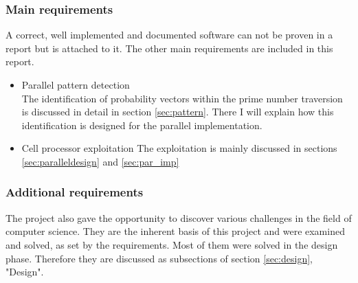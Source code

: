 \subsubsection{Main requirements}
\label{sec:main_req}
A correct, well implemented and documented software can not be proven in a report but is attached to it. The other main requirements are included in this report.

\begin{itemize}%
   \item Parallel pattern detection\\
      The identification of probability vectors within the prime number traversion is discussed in detail in section \ref{sec:pattern}. There I will explain how this identification is designed for the parallel implementation.
   \item Cell processor exploitation
      The exploitation is mainly discussed in sections \ref{sec:paralleldesign} and \ref{sec:par_imp}
\end{itemize}%


\subsubsection{Additional requirements}
\label{sec:additional_req}
The project also gave the opportunity to discover various challenges in the field of computer science. They are the inherent basis of this project and were examined and solved, as set by the requirements. Most of them were solved in the design phase. Therefore they are discussed as subsections of  section \ref{sec:design}, "Design".


